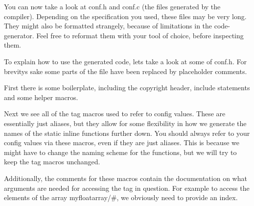 You can now take a look at {\ttfamily conf.\+h} and {\ttfamily conf.\+c} (the files generated by the compiler). Depending on the specification you used, these files may be very long. They might also be formatted strangely, because of limitations in the code-\/generator. Feel free to reformat them with your tool of choice, before inspecting them.

To explain how to use the generated code, lets take a look at some of {\ttfamily conf.\+h}. For brevity\textquotesingle{}s sake some parts of the file have been replaced by placeholder comments.


\begin{DoxyCode}{0}
\DoxyCodeLine{\textcolor{comment}{/* file header ... */}}
\DoxyCodeLine{}
\DoxyCodeLine{\textcolor{preprocessor}{\#ifndef CONF\_H}}
\DoxyCodeLine{\textcolor{preprocessor}{\#define CONF\_H}}
\DoxyCodeLine{}
\DoxyCodeLine{\textcolor{preprocessor}{\#ifdef \_\_cplusplus}}
\DoxyCodeLine{\textcolor{keyword}{extern} \textcolor{stringliteral}{"C"} \{}
\DoxyCodeLine{\textcolor{preprocessor}{\#endif}}
\DoxyCodeLine{}
\DoxyCodeLine{\textcolor{comment}{/* includes ... */}}
\DoxyCodeLine{}
\DoxyCodeLine{\textcolor{comment}{/* helper macros ... */}}
\end{DoxyCode}


First there is some boilerplate, including the copyright header, include statements and some helper macros.


\begin{DoxyCode}{0}
\DoxyCodeLine{}
\DoxyCodeLine{\textcolor{preprocessor}{\#define ELEKTRA\_TAG\_MYDOUBLE Mydouble}}
\DoxyCodeLine{}
\DoxyCodeLine{\textcolor{preprocessor}{\#define ELEKTRA\_TAG\_MYFLOATARRAY Myfloatarray}}
\end{DoxyCode}


Next we see all of the \textquotesingle{}tag macros\textquotesingle{} used to refer to config values. These are essentially just aliases, but they allow for some flexibility in how we generate the names of the {\ttfamily static inline} functions further down. You should always refer to your config values via these macros, even if they are just aliases. This is because we might have to change the naming scheme for the functions, but we will try to keep the tag macros unchanged.

Additionally, the comments for these macros contain the documentation on what arguments are needed for accessing the tag in question. For example to access the elements of the array {\ttfamily myfloatarray/\#}, we obviously need to provide an index.


